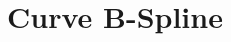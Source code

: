 \documentclass[a4paper, 10pt]{article}
\begin{document}
\renewcommand{\lstlistingname}{Codice}



\tableofcontents


%
%
%
%
%
%
%


\section{Curve B-Spline} 
\end{document}

